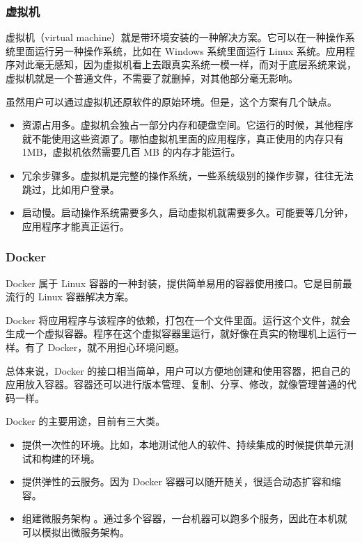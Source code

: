 \subsubsection{虚拟机}

虚拟机（virtual machine）就是带环境安装的一种解决方案。它可以在一种操作系统里面运行另一种操作系统，比如在 Windows 系统里面运行 Linux 系统。应用程序对此毫无感知，因为虚拟机看上去跟真实系统一模一样，而对于底层系统来说，虚拟机就是一个普通文件，不需要了就删掉，对其他部分毫无影响。

虽然用户可以通过虚拟机还原软件的原始环境。但是，这个方案有几个缺点。

\begin{itemize}
  \item 资源占用多。虚拟机会独占一部分内存和硬盘空间。它运行的时候，其他程序就不能使用这些资源了。哪怕虚拟机里面的应用程序，真正使用的内存只有 1MB，虚拟机依然需要几百 MB 的内存才能运行。
  \item 冗余步骤多。虚拟机是完整的操作系统，一些系统级别的操作步骤，往往无法跳过，比如用户登录。
  \item 启动慢。启动操作系统需要多久，启动虚拟机就需要多久。可能要等几分钟，应用程序才能真正运行。
\end{itemize}

\subsubsection{Docker}

Docker 属于 Linux 容器的一种封装，提供简单易用的容器使用接口。它是目前最流行的 Linux 容器解决方案。

Docker 将应用程序与该程序的依赖，打包在一个文件里面。运行这个文件，就会生成一个虚拟容器。程序在这个虚拟容器里运行，就好像在真实的物理机上运行一样。有了 Docker，就不用担心环境问题。

总体来说，Docker 的接口相当简单，用户可以方便地创建和使用容器，把自己的应用放入容器。容器还可以进行版本管理、复制、分享、修改，就像管理普通的代码一样。

Docker 的主要用途，目前有三大类。
\begin{itemize}
\item 提供一次性的环境。比如，本地测试他人的软件、持续集成的时候提供单元测试和构建的环境。
\item 提供弹性的云服务。因为 Docker 容器可以随开随关，很适合动态扩容和缩容。
\item 组建微服务架构
\cite{张英2011微服务}。通过多个容器，一台机器可以跑多个服务，因此在本机就可以模拟出微服务架构。
\end{itemize}
